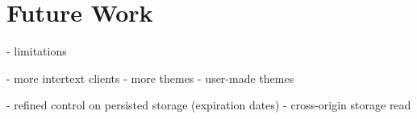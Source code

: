 
\section{Future Work} \label{futureWork}

- limitations

- more intertext clients
- more themes
- user-made themes

- refined control on persisted storage (expiration dates)
- cross-origin storage read
